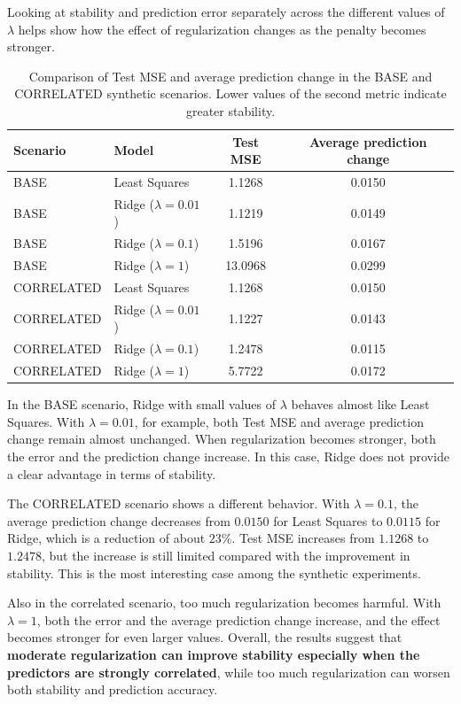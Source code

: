 \documentclass[11pt,a4paper]{article}
\begin{document}
Looking at stability and prediction error separately across the different values of $\lambda$ helps show how the effect of regularization changes as the penalty becomes stronger.

\begin{table}[ht]
    \centering
    \begin{tabular}{llcc}
        \toprule
        Scenario & Model & Test MSE & Average prediction change \\
        \midrule
        BASE & Least Squares & 1.1268 & 0.0150 \\
        BASE & Ridge ($\lambda=0.01$) & 1.1219 & 0.0149 \\
        BASE & Ridge ($\lambda=0.1$) & 1.5196 & 0.0167 \\
        BASE & Ridge ($\lambda=1$) & 13.0968 & 0.0299 \\
        \midrule
        CORRELATED & Least Squares & 1.1268 & 0.0150 \\
        CORRELATED & Ridge ($\lambda=0.01$) & 1.1227 & 0.0143 \\
        CORRELATED & Ridge ($\lambda=0.1$) & 1.2478 & 0.0115 \\
        CORRELATED & Ridge ($\lambda=1$) & 5.7722 & 0.0172 \\
        \bottomrule
    \end{tabular}
    \caption{Comparison of Test MSE and average prediction change in the BASE and CORRELATED synthetic scenarios. Lower values of the second metric indicate greater stability.}
    \label{tab:synthetic-results}
\end{table}

In the BASE scenario, Ridge with small values of $\lambda$ behaves almost like Least Squares. With $\lambda=0.01$, for example, both Test MSE and average prediction change remain almost unchanged. When regularization becomes stronger, both the error and the prediction change increase. In this case, Ridge does not provide a clear advantage in terms of stability.

The CORRELATED scenario shows a different behavior. With $\lambda=0.1$, the average prediction change decreases from $0.0150$ for Least Squares to $0.0115$ for Ridge, which is a reduction of about $23\%$. Test MSE increases from $1.1268$ to $1.2478$, but the increase is still limited compared with the improvement in stability. This is the most interesting case among the synthetic experiments.

Also in the correlated scenario, too much regularization becomes harmful. With $\lambda=1$, both the error and the average prediction change increase, and the effect becomes stronger for even larger values. Overall, the results suggest that \textbf{moderate regularization can improve stability especially when the predictors are strongly correlated}, while too much regularization can worsen both stability and prediction accuracy.
\end{document}
